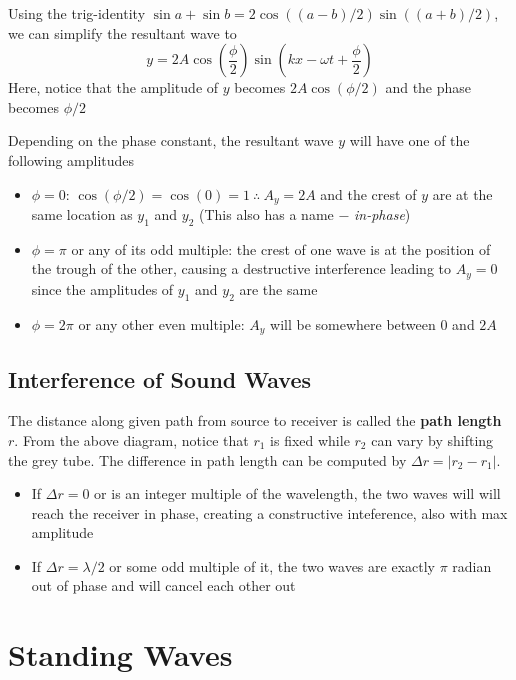 Using the trig-identity $\sin a + \sin b = 2\cos((a-b)/2)\sin((a+b)/2)$,
we can simplify the resultant wave to 
\begin{equation}
    y = 2A\cos\left(\frac{\phi}{2}\right)\sin\left(kx - \omega t + \frac{\phi}{2}\right)
\end{equation}
Here, notice that the amplitude of $y$ becomes $2A\cos(\phi/2)$ and the phase becomes $\phi/2$

Depending on the phase constant, the resultant wave $y$ will have one of the following amplitudes
\begin{itemize}
    \item $\phi = 0$: $\cos(\phi/2) = \cos(0) = 1\ \therefore\ A_y = 2A$ and the crest
        of $y$ are at the same location as $y_1$ and $y_2$
        (This also has a name $-$ \textit{in-phase})
    \item $\phi = \pi$ or any of its odd multiple: the crest of one wave is at the position of
        the trough of the other, causing a destructive interference leading to $A_y = 0$ since 
        the amplitudes of $y_1$ and $y_2$ are the same
    \item $\phi = 2\pi$ or any other even multiple: $A_y$ will be somewhere between $0$ and $2A$
\end{itemize}

\subsection{Interference of Sound Waves}

The distance along given path from source to receiver is called the \textbf{path length} $r$.
From the above diagram, notice that $r_1$ is fixed while $r_2$ can vary by shifting the grey tube.
The difference in path length can be computed by $\Delta r = |r_2 - r_1|$.
\begin{itemize}
    \item If $\Delta r = 0$ or is an integer multiple of the wavelength, the two waves will
        will reach the receiver in phase, creating a constructive inteference, also with max amplitude
    \item If $\Delta r = \lambda/2$ or some odd multiple of it, the two waves are exactly
        $\pi$ radian out of phase and will cancel each other out 
\end{itemize}

\section{Standing Waves}

